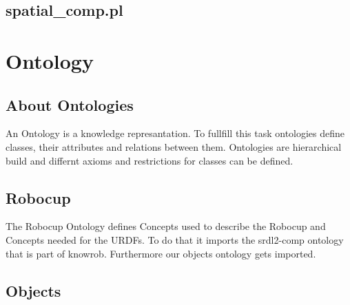 \documentclass[main.tex]{subfiles}
\begin{document}
\subsection{spatial\_comp.pl}



\section{Ontology}
\subsection{About Ontologies}
An Ontology is a knowledge represantation. To fullfill this task ontologies define classes, their attributes and relations between them. Ontologies are hierarchical build and differnt axioms and restrictions for classes can be defined.


\subsection{Robocup}
The Robocup Ontology defines Concepts used to describe the Robocup and Concepts needed for the URDFs. To do that it imports the srdl2-comp ontology that is part of knowrob. Furthermore our objects ontology gets imported.\\


\subsection{Objects}
\end{document}

